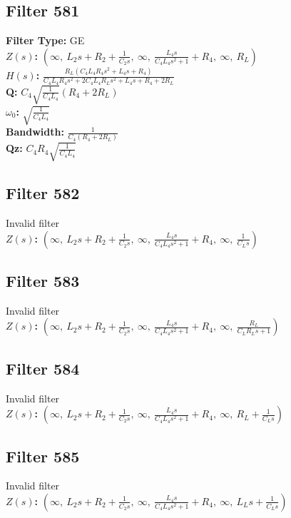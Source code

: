 \documentclass{article}
\begin{document}
\subsection*{Filter 581}
\textbf{Filter Type:} GE \\ 
\textbf{$Z(s)$:} $\left( \infty, \  L_{2} s + R_{2} + \frac{1}{C_{2} s}, \  \infty, \  \frac{L_{4} s}{C_{4} L_{4} s^{2} + 1} + R_{4}, \  \infty, \  R_{L}\right)$ \\ 
\textbf{$H(s)$:} $\frac{R_{L} \left(C_{4} L_{4} R_{4} s^{2} + L_{4} s + R_{4}\right)}{C_{4} L_{4} R_{4} s^{2} + 2 C_{4} L_{4} R_{L} s^{2} + L_{4} s + R_{4} + 2 R_{L}}$ \\ 
\textbf{Q:} $C_{4} \sqrt{\frac{1}{C_{4} L_{4}}} \left(R_{4} + 2 R_{L}\right)$ \\ 
\textbf{$\omega_0$:} $\sqrt{\frac{1}{C_{4} L_{4}}}$ \\ 
\textbf{Bandwidth:} $\frac{1}{C_{4} \left(R_{4} + 2 R_{L}\right)}$ \\ 
\textbf{Qz:} $C_{4} R_{4} \sqrt{\frac{1}{C_{4} L_{4}}}$ \\ 
\subsection*{Filter 582}
Invalid filter \\ 
\textbf{$Z(s)$:} $\left( \infty, \  L_{2} s + R_{2} + \frac{1}{C_{2} s}, \  \infty, \  \frac{L_{4} s}{C_{4} L_{4} s^{2} + 1} + R_{4}, \  \infty, \  \frac{1}{C_{L} s}\right)$ \\ 
\subsection*{Filter 583}
Invalid filter \\ 
\textbf{$Z(s)$:} $\left( \infty, \  L_{2} s + R_{2} + \frac{1}{C_{2} s}, \  \infty, \  \frac{L_{4} s}{C_{4} L_{4} s^{2} + 1} + R_{4}, \  \infty, \  \frac{R_{L}}{C_{L} R_{L} s + 1}\right)$ \\ 
\subsection*{Filter 584}
Invalid filter \\ 
\textbf{$Z(s)$:} $\left( \infty, \  L_{2} s + R_{2} + \frac{1}{C_{2} s}, \  \infty, \  \frac{L_{4} s}{C_{4} L_{4} s^{2} + 1} + R_{4}, \  \infty, \  R_{L} + \frac{1}{C_{L} s}\right)$ \\ 
\subsection*{Filter 585}
Invalid filter \\ 
\textbf{$Z(s)$:} $\left( \infty, \  L_{2} s + R_{2} + \frac{1}{C_{2} s}, \  \infty, \  \frac{L_{4} s}{C_{4} L_{4} s^{2} + 1} + R_{4}, \  \infty, \  L_{L} s + \frac{1}{C_{L} s}\right)$ \\ 
\end{document}
